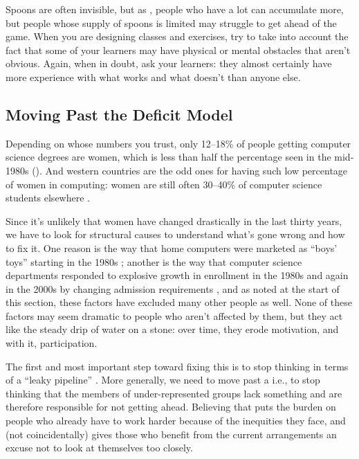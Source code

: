 Spoons are often invisible, but as , people who have a lot can accumulate more,
but people whose supply of spoons is limited may struggle to get ahead
of the game. When you are designing classes and exercises, try to take
into account the fact that some of your learners may have physical or
mental obstacles that aren't obvious. Again, when in doubt, ask your
learners: they almost certainly have more experience with what works
and what doesn't than anyone else.

\subsection*{Moving Past the Deficit Model}

Depending on whose numbers you trust, only 12--18\% of people getting
computer science degrees are women, which is less than half the
percentage seen in the mid-1980s (). And
western countries are the odd ones for having such low percentage of
women in computing: women are still often 30--40\% of computer science
students elsewhere \cite{Galp2002,Varm2015}.


Since it's unlikely that women have changed drastically in the last
thirty years, we have to look for structural causes to understand what's
gone wrong and how to fix it. One reason is the way that home computers
were marketed as ``boys' toys'' starting in the 1980s \cite{Marg2003};
another is the way that computer science departments responded to
explosive growth in enrollment in the 1980s and again in the 2000s by
changing admission requirements \cite{Robe2017}, and as noted at the
start of this section, these factors have excluded many other people as
well. None of these factors may seem dramatic to people who aren't
affected by them, but they act like the steady drip of water on a stone:
over time, they erode motivation, and with it, participation.

The first and most important step toward fixing this is to stop thinking
in terms of a ``leaky pipeline'' \cite{Mill2015}. More generally, we need to
move past a  i.e., to stop
thinking that the members of under-represented groups lack something and
are therefore responsible for not getting ahead. Believing that puts the
burden on people who already have to work harder because of the
inequities they face, and (not coincidentally) gives those who benefit
from the current arrangements an excuse not to look at themselves too
closely.

